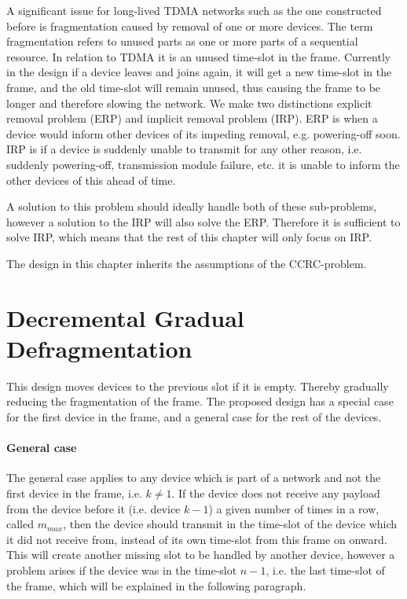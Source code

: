 A significant issue for long-lived TDMA networks such as the one constructed before is fragmentation caused by removal of one or more devices. 
The term fragmentation refers to unused parts as one or more parts of a sequential resource. 
In relation to TDMA it is an unused time-slot in the frame. 
Currently in the design if a device leaves and joins again, it will get a new time-slot in the frame, and the old time-slot will remain unused, thus causing the frame to be longer and therefore slowing the network.
We make two distinctions explicit removal problem (ERP) and implicit removal problem (IRP).
ERP is when a device would inform other devices of its impeding removal, e.g. powering-off soon. 
IRP is if a device is suddenly unable to transmit for any other reason, i.e. suddenly powering-off, transmission module failure, etc. it is unable to inform the other devices of this ahead of time. 

A solution to this problem should ideally handle both of these sub-problems, however a solution to the IRP will also solve the ERP.
Therefore it is sufficient to solve IRP, which means that the rest of this chapter will only focus on IRP.  

The design in this chapter inherits the assumptions of the CCRC-problem. 

\section{Decremental Gradual Defragmentation}
This design moves devices to the previous slot if it is empty. 
Thereby gradually reducing the fragmentation of the frame.
The proposed design has a special case for the first device in the frame, and a general case for the rest of the devices.

\paragraph{General case}
The general case applies to any device which is part of a network and not the first device in the frame, i.e. $k \neq 1$.
If the device does not receive any payload from the device before it (i.e. device $k - 1$) a given number of times in a row, called $m_{max}$, then the device should transmit in the time-slot of the device which it did not receive from, instead of its own time-slot from this frame on onward. 
This will create another missing slot to be handled by another device, however a problem arises if the device was in the time-slot $n - 1$, i.e. the last time-slot of the frame, which will be explained in the following paragraph.

